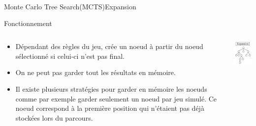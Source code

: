 \begin{frame}{Monte Carlo Tree Search(MCTS)}{Expansion}
	\begin{block}{Fonctionnement}
		\begin{columns}
			\begin{column}{8cm}
				\begin{itemize}
					\item Dépendant des règles du jeu, crée un noeud à partir du noeud sélectionné si celui-ci n'est pas final.
					\item On ne peut pas garder tout les résultats en mémoire.
					\item Il existe plusieurs stratégies pour garder en mémoire les noeuds comme par exemple garder seulement un noeud par jeu simulé. Ce noeud correspond à la première position qui n'étaient pas déjà stockées lors du parcours.
				\end{itemize}
			\end{column}
			\begin{column}{4cm}
				\includegraphics[width=3cm]{ressources/Expansion.png}
			\end{column}
		\end{columns}
	\end{block}
\end{frame}


